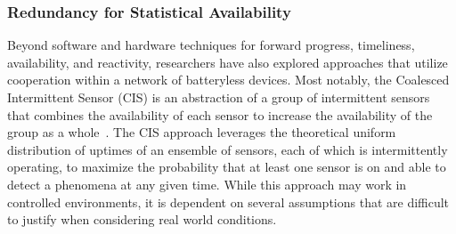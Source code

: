 


\subsubsection{Redundancy for Statistical Availability}
Beyond software and hardware techniques for forward progress, timeliness, availability, and reactivity, researchers have also explored approaches that utilize cooperation within a network of batteryless devices.
Most notably, the Coalesced Intermittent Sensor (CIS) is an abstraction of a group of intermittent sensors that combines the availability of each sensor to increase the availability of the group as a whole~\cite{majid2020continuous}.
The CIS approach leverages the theoretical uniform distribution of uptimes of an ensemble of sensors, each of which is intermittently operating, to maximize the probability that at least one sensor is on and able to detect a phenomena at any given time.
While this approach may work in controlled environments, it is dependent on several assumptions that are difficult to justify when considering real world conditions.

